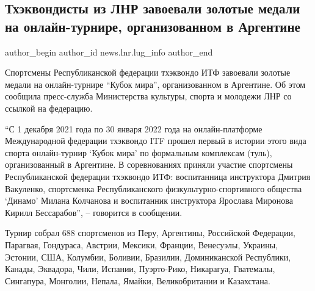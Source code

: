  
 
 
 
 
 
\subsection{Тхэквондисты из ЛНР завоевали золотые медали на онлайн-турнире, организованном в Аргентине}
\label{sec:04_02_2022.stz.news.lnr.lug_info.2.tekvondo_sport_argentina}
 
\ifcmt
 author_begin
   author_id news.lnr.lug_info
 author_end
\fi

Спортсмены Республиканской федерации тхэквондо ИТФ завоевали золотые медали на
онлайн-турнире \enquote{Кубок мира}, организованном в Аргентине. Об этом сообщила
пресс-служба Министерства культуры, спорта и молодежи ЛНР со ссылкой на
федерацию.


\enquote{С 1 декабря 2021 года по 30 января 2022 года на онлайн-платформе Международной
федерации тхэквондо ITF прошел первый в истории этого вида спорта онлайн-турнир
\enquote{Кубок мира} по формальным комплексам (туль), организованный в Аргентине. В
соревнованиях приняли участие спортсмены Республиканской федерации тхэквондо
ИТФ: воспитанница инструктора Дмитрия Вакуленко, спортсменка Республиканского
физкультурно-спортивного общества \enquote{Динамо} Милана Колчанова и воспитанник
инструктора Ярослава Миронова Кирилл Бессарабов}, – говорится в сообщении.


Турнир собрал 688 спортсменов из Перу, Аргентины, Российской Федерации,
Парагвая, Гондураса, Австрии, Мексики, Франции, Венесуэлы, Украины, Эстонии,
США, Колумбии, Боливии, Бразилии, Доминиканской Республики, Канады, Эквадора,
Чили, Испании, Пуэрто-Рико, Никарагуа, Гватемалы, Сингапура, Монголии, Непала,
Ямайки, Великобритании и Казахстана.


